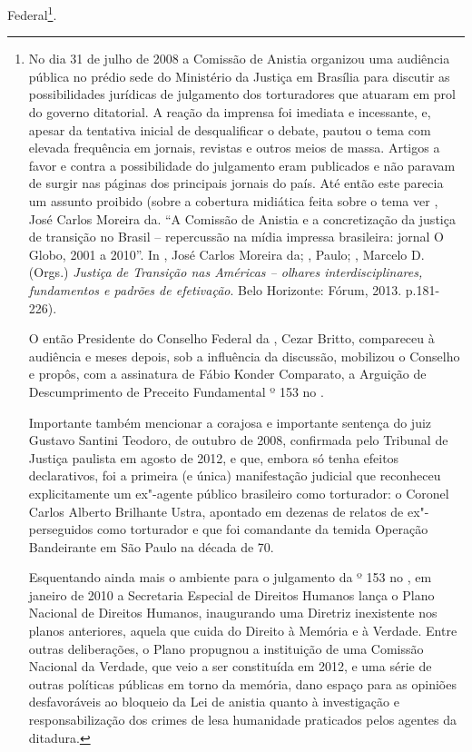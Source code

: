 Federal\footnote{No dia 31 de julho de 2008 a Comissão de Anistia
  organizou uma audiência pública no prédio sede do Ministério da
  Justiça em Brasília para discutir as possibilidades jurídicas de
  julgamento dos torturadores que atuaram em prol do governo ditatorial.
  A reação da imprensa foi imediata e incessante, e, apesar da tentativa
  inicial de desqualificar o debate, pautou o tema com elevada
  frequência em jornais, revistas e outros meios de massa. Artigos a
  favor e contra a possibilidade do julgamento eram publicados e não
  paravam de surgir nas páginas dos principais jornais do país. Até
  então este parecia um assunto proibido (sobre a cobertura midiática
  feita sobre o tema ver  ,
  José Carlos Moreira da. ``A Comissão
  de Anistia e a concretização da justiça de transição no Brasil --
  repercussão na mídia impressa brasileira: jornal O Globo, 2001 a
  2010''. In  , José Carlos Moreira
  da; , Paulo; ,
  Marcelo D. (Orgs.) \emph{Justiça de Transição nas Américas --
  olhares interdisciplinares, fundamentos e padrões de efetivação}. Belo
  Horizonte: Fórum, 2013. p.181-226).

  O então Presidente do Conselho Federal da , Cezar Britto,
  compareceu à audiência e meses depois, sob a influência da discussão,
  mobilizou o Conselho e propôs, com a assinatura de Fábio Konder
  Comparato, a Arguição de Descumprimento de Preceito Fundamental º 153
  no .

  Importante também mencionar a corajosa e importante sentença do juiz
  Gustavo Santini Teodoro, de outubro de 2008, confirmada pelo Tribunal
  de Justiça paulista em agosto de 2012, e que, embora só tenha efeitos
  declarativos, foi a primeira (e única) manifestação judicial que
  reconheceu explicitamente um ex"-agente público brasileiro como
  torturador: o Coronel Carlos Alberto Brilhante Ustra, apontado em
  dezenas de relatos de ex"-perseguidos como torturador e que foi
  comandante da temida Operação Bandeirante em São Paulo na década de
  70.

  Esquentando ainda mais o ambiente para o julgamento da  º 153 no
  , em janeiro de 2010 a Secretaria Especial de Direitos Humanos
  lança o  Plano Nacional de Direitos Humanos, inaugurando uma
  Diretriz inexistente nos planos anteriores, aquela que cuida do
  Direito à Memória e à Verdade. Entre outras deliberações, o Plano
  propugnou a instituição de uma Comissão Nacional da Verdade, que veio
  a ser constituída em 2012, e uma série de outras políticas públicas em
  torno da memória, dano espaço para as opiniões desfavoráveis ao
  bloqueio da Lei de anistia quanto à investigação e responsabilização
  dos crimes de lesa humanidade praticados pelos agentes da ditadura.}.

